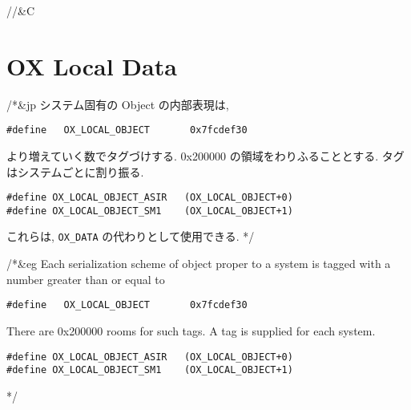//&C \section{ OX Local Data }

/*&jp
システム固有の Object の内部表現は,
\begin{verbatim}
#define   OX_LOCAL_OBJECT       0x7fcdef30
\end{verbatim}
より増えていく数でタグづけする.
0x200000 の領域をわりふることとする.
タグはシステムごとに割り振る.
\begin{verbatim}
#define OX_LOCAL_OBJECT_ASIR   (OX_LOCAL_OBJECT+0)
#define OX_LOCAL_OBJECT_SM1    (OX_LOCAL_OBJECT+1)
\end{verbatim}
これらは, {\tt OX\_DATA} の代わりとして使用できる.
*/

/*&eg
Each serialization scheme of object proper to a system is
tagged with a number greater than or equal to 
\begin{verbatim}
#define   OX_LOCAL_OBJECT       0x7fcdef30
\end{verbatim}
There are 0x200000 rooms for such tags.
A tag is supplied for each system.
\begin{verbatim}
#define OX_LOCAL_OBJECT_ASIR   (OX_LOCAL_OBJECT+0)
#define OX_LOCAL_OBJECT_SM1    (OX_LOCAL_OBJECT+1)
\end{verbatim}
*/
